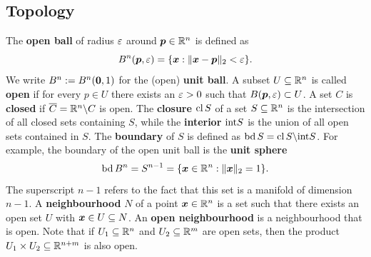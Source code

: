 \subsection{Topology}
\strictpagecheck
The \textbf{open ball} of radius $\varepsilon$ around $\bm{p}\in \mathbb{R}^n$ is defined as
\begin{equation*}
 B^n(\bm{p},\varepsilon) = \{\bm{x} \mathrel{\mathop{:}} \Vert {\bm{x}-\bm{p}}\Vert_2<\varepsilon\}.
\end{equation*}
We write $B^n:=B^n(\bm{0},1)$ for the (open) \textbf{unit ball}.
A subset $U\subseteq \mathbb{R}^n$ is called \textbf{open} if for every $p\in U$ there exists an $\varepsilon>0$ such that $B(\bm{p},\varepsilon)\subset U$. A set $C$ is \textbf{closed} if $\overline{C}=\mathbb{R}^n\backslash C$ is open. 
The \textbf{closure} $\operatorname{cl} S$ of a set $S\subseteq \mathbb{R}^n$ is the intersection of all closed sets containing $S$, while the \textbf{interior} ${\operatorname{int}} S$ is the union of all open sets contained in $S$. 
The \textbf{boundary} of $S$ is defined as $\operatorname{bd} S = \operatorname{cl} S\backslash {\operatorname{int}} S$. For example, the boundary of the open unit ball is the \textbf{unit sphere}
\begin{equation*}
 \operatorname{bd} B^n = S^{n-1} = \{\bm{x}\in \mathbb{R}^n \mathrel{\mathop{:}} \Vert {\bm{x}}\Vert_2 = 1\}.
\end{equation*}
The superscript $n-1$ refers to the fact that this set is a manifold of dimension $n-1$. A \strictpagecheck{}\textbf{neighbourhood} $N$ of a point $\bm{x}\in \mathbb{R}^n$ is a set such that there exists an open set $U$ with $\bm{x}\in U\subseteq N$. An \textbf{open neighbourhood} is a neighbourhood that is open. 
Note that if $U_1\subseteq \mathbb{R}^n$ and $U_2\subseteq \mathbb{R}^m$ are open sets, then the product $U_1\times U_2 \subseteq \mathbb{R}^{n+m}$ is also open. 

